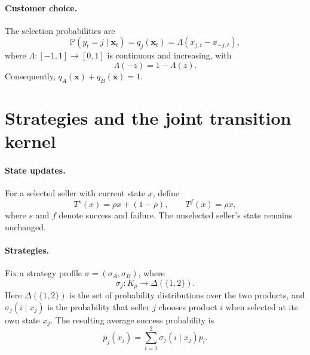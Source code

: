 \documentclass[11pt]{article}
\newcommand{\Pb}{\mathbb P}
\newcommand{\K}{K_\rho}
\newcommand{\xx}{\mathbf x}
\begin{document}
\paragraph{Customer choice.}
The selection probabilities are
\begin{equation}\label{eq:demand}
\Pb(y_t=j\mid\xx_t)=q_j(\xx_t)
=\Lambda(x_{j,t}-x_{-j,t}),
\end{equation}
where $\Lambda:[-1,1]\to[0,1]$ is continuous and increasing, with
\begin{equation}\label{eq:demand-symmetry}
\Lambda(-z)=1-\Lambda(z).
\end{equation}
Consequently, $q_A(\xx)+q_B(\xx)=1$.

\clearpage
\section{Strategies and the joint transition kernel}

\paragraph{State updates.}
For a selected seller with current state $x$, define
\begin{equation}\label{eq:scalar-transitions}
T^s(x)=\rho x+(1-\rho),\qquad T^f(x)=\rho x,
\end{equation}
where $s$ and $f$ denote success and failure. The unselected seller's
state remains unchanged.

\paragraph{Strategies.}
Fix a strategy profile $\sigma=(\sigma_A,\sigma_B)$, where
\begin{equation}\label{eq:strategies}
\sigma_j:\K\longrightarrow\Delta(\{1,2\}).
\end{equation}
Here $\Delta(\{1,2\})$ is the set of probability distributions over
the two products, and $\sigma_j(i\mid x_j)$ is the probability that
seller $j$ chooses product $i$ when selected at its own state $x_j$.
The resulting average success probability is
\begin{equation}\label{eq:average-success}
\bar p_j(x_j)=\sum_{i=1}^2\sigma_j(i\mid x_j)p_i.
\end{equation}
\end{document}

